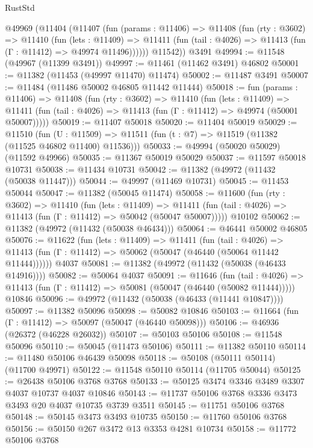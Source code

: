 \begin{lexlean}{RustStd}
\begin{coremodule}
    @49969
      (@11404
        (@11407
          (fun (params : @11406) =>
          @11408
            (fun (rty : @3602) =>
            @11410
              (fun (lets : @11409) =>
              @11411 (fun (tail : @4026) => @11413 (fun (Γ : @11412) => @49974 @11496))))))
        @11542))
    @3491
@49994 := @11548 (@49967 (@11399 @3491))
@49997 := @11461 (@11462 @3491) @46802
@50001 := @11382 (@11453 (@49997 @11470) @11474)
@50002 := @11487 @3491
@50007 := @11484 (@11486 @50002 @46805 @11442 @11444)
@50018 := fun (params : @11406) =>
  @11408
    (fun (rty : @3602) =>
    @11410
      (fun (lets : @11409) =>
      @11411 (fun (tail : @4026) => @11413 (fun (Γ : @11412) => @49974 (@50001 @50007)))))
@50019 := @11407 @50018
@50020 := @11404 @50019
@50029 := @11510
    (fun (U : @11509) => @11511 (fun (t : @7) => @11519 (@11382 (@11525 @46802 @11400) @11536)))
@50033 := @49994 (@50020 @50029) (@11592 @49966)
@50035 := @11367 @50019 @50029
@50037 := @11597 @50018 @10731
@50038 := @11434 @10731
@50042 := @11382 (@49972 (@11432 (@50038 @11447)))
@50044 := @49997 (@11469 @10731)
@50045 := @11453 @50044
@50047 := @11382 (@50045 @11474)
@50058 := @11600
    (fun (rty : @3602) =>
    @11410
      (fun (lets : @11409) =>
      @11411 (fun (tail : @4026) => @11413 (fun (Γ : @11412) => @50042 (@50047 @50007)))))
    @10102
@50062 := @11382 (@49972 (@11432 (@50038 @46434)))
@50064 := @46441 @50002 @46805
@50076 := @11622
    (fun (lets : @11409) =>
    @11411
      (fun (tail : @4026) =>
      @11413 (fun (Γ : @11412) => @50062 (@50047 (@46440 (@50064 @11442 @11444))))))
    @4037
@50081 := @11382 (@49972 (@11432 (@50038 (@46433 @14916))))
@50082 := @50064 @4037
@50091 := @11646
    (fun (tail : @4026) => @11413 (fun (Γ : @11412) => @50081 (@50047 (@46440 (@50082 @11444)))))
    @10846
@50096 := @49972 (@11432 (@50038 (@46433 (@11441 @10847))))
@50097 := @11382 @50096
@50098 := @50082 @10846
@50103 := @11664 (fun (Γ : @11412) => @50097 (@50047 (@46440 @50098)))
@50106 := @46936 (@26372 (@46228 @26032))
@50107 := @50103 @50106
@50108 := @11548 @50096
@50110 := @50045 (@11473 @50106)
@50111 := @11382 @50110
@50114 := @11480 @50106 @46439 @50098
@50118 := @50108 (@50111 @50114) (@11700 @49971)
@50122 := @11548 @50110 @50114 (@11705 @50044)
@50125 := @26438 @50106 @3768 @3768
@50133 := @50125 @3474 @3346 @3489 @3307 @4037 @10737 @4037 @10846
@50143 := @11737 @50106 @3768 @3336 @3473 @3493 @20 @4037 @10735 @3739 @3511
@50145 := @11751 @50106 @3768
@50148 := @50145 @3473 @3493 @10735
@50150 := @11760 @50106 @3768
@50156 := @50150 @267 @3472 @13 @3353 @4281 @10734
@50158 := @11772 @50106 @3768

\end{coremodule}
\end{lexlean}
